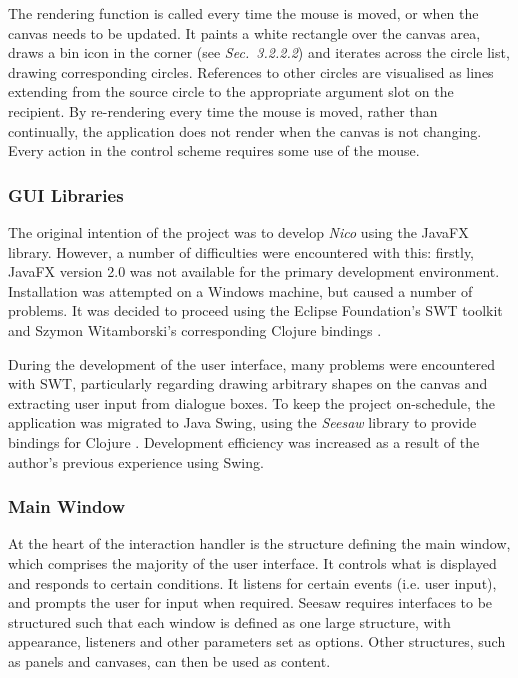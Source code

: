 \documentclass[12pt,twoside,notitlepage,xetex]{report}
\begin{document}
{The rendering function is called every time the mouse is moved, or when the canvas needs to be updated.  It paints a white rectangle over the canvas area, draws a bin icon in the corner (see \emph{Sec.~3.2.2.2}) and iterates across the circle list, drawing corresponding circles.  References to other circles are visualised as lines extending from the source circle to the appropriate argument slot on the recipient.  By re-rendering every time the mouse is moved, rather than continually, the application does not render when the canvas is not changing.  Every action in the control scheme requires some use of the mouse.

\subsubsection{GUI Libraries}

The original intention of the project was to develop \emph{Nico} using the JavaFX library. However, a number of difficulties were encountered with this: firstly, JavaFX version 2.0 was not available for the primary development environment.  Installation was attempted on a Windows machine, but caused a number of problems. It was decided to proceed using the Eclipse Foundation's SWT toolkit and Szymon Witamborski's corresponding Clojure bindings \cite{GuiFtw}.

During the development of the user interface, many problems were encountered with SWT, particularly regarding drawing arbitrary shapes on the canvas and extracting user input from dialogue boxes.  To keep the project on-schedule, the application was migrated to Java Swing, using the \emph{Seesaw} library to provide bindings for Clojure \cite{Seesaw}.  Development efficiency was increased as a result of the author's previous experience using Swing.

\subsubsection{Main Window}

At the heart of the interaction handler is the structure defining the main window, which comprises the majority of the user interface.  It controls what is displayed and responds to certain conditions.  It listens for certain events (i.e. user input), and prompts the user for input when required.  Seesaw requires interfaces to be structured such that each window is defined as one large structure, with appearance, listeners and other parameters set as options.  Other structures, such as panels and canvases, can then be used as content.

}
\end{document}
